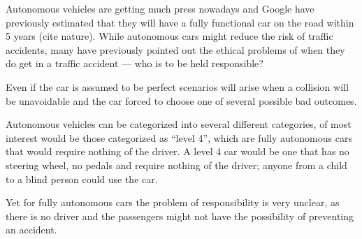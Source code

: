 Autonomous vehicles are getting much press nowadays and Google have previously
estimated that they will have a fully functional car on the road within 5 years
(cite nature). While autonomous cars might reduce the risk of traffic accidents,
many have previously pointed out the ethical problems of when they do get in a
traffic accident --- who is to be held responsible?

Even if the car is assumed to be perfect scenarios will arise when a collision
will be unavoidable and the car forced to choose one of several possible bad
outcomes.

Autonomous vehicles can be categorized into several different categories, of
most interest would be those categorized as ``level 4'', which are fully
autonomous cars that would require nothing of the driver. A level 4 car would be
one that has no steering wheel, no pedals and require nothing of the driver;
anyone from a child to a blind person could use the car.

Yet for fully autonomous cars the problem of responsibility is very unclear,
as there is no driver and the passengers might not have the possibility of
preventing an accident.
